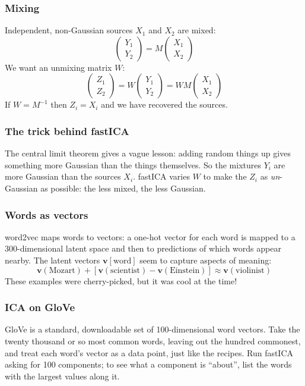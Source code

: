 \documentclass{beamer}
\begin{document}
\begin{frame}
\frametitle{Mixing}
\vskip 0.25cm
Independent, non-Gaussian sources $X_1$ and $X_2$ are mixed:
$$
\begin{pmatrix}Y_1\\Y_2\end{pmatrix}=M\begin{pmatrix}X_1\\X_2\end{pmatrix}
$$
We want an unmixing matrix $W$:
$$
\begin{pmatrix}Z_1\\Z_2\end{pmatrix}=W\begin{pmatrix}Y_1\\Y_2\end{pmatrix}=WM\begin{pmatrix}X_1\\X_2\end{pmatrix}
$$
If $W=M^{-1}$ then $Z_i=X_i$ and we have recovered the sources.
\end{frame}

\begin{frame}
\frametitle{The trick behind fastICA}
\vskip 0.25cm
The central limit theorem gives a vague lesson: adding random things up gives something more Gaussian than the things themselves.
\vskip 0.5cm
So the mixtures $Y_i$ are more Gaussian than the sources $X_i$.
\vskip 0.5cm
fastICA varies $W$ to make the $Z_i$ as \emph{un}-Gaussian as possible: the less mixed, the less Gaussian.
\end{frame}

\begin{frame}
\frametitle{Words as vectors}
\vskip 0.25cm
word2vec maps words to vectors: a one-hot vector for each word is mapped to a 300-dimensional latent space and then to predictions of which words appear nearby.
\vskip 0.5cm
The latent vectors $\mathbf{v}[\text{word}]$ seem to capture aspects of meaning:
$$
\mathbf{v}(\text{Mozart})+[\mathbf{v}(\text{scientist})-\mathbf{v}(\text{Einstein})]\approx\mathbf{v}(\text{violinist})
$$
These examples were cherry-picked, but it was cool at the time!
\end{frame}

\begin{frame}
\frametitle{ICA on GloVe}
\vskip 0.25cm
GloVe is a standard, downloadable set of 100-dimensional word vectors.
\vskip 0.5cm
Take the twenty thousand or so most common words, leaving out the hundred commonest, and treat each word's vector as a data point, just like the recipes.
\vskip 0.5cm
Run fastICA asking for 100 components; to see what a component is ``about'', list the words with the largest values along it.
\end{frame}
\end{document}
